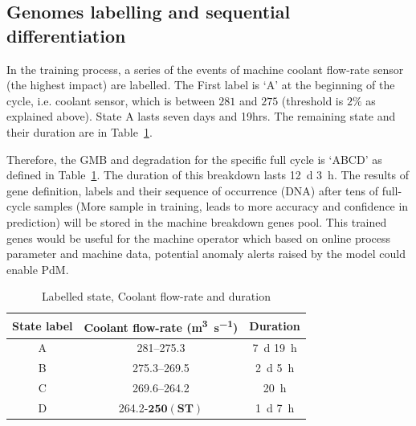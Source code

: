 \documentclass[conference]{IEEEtran}
\begin{document}
\subsection{Genomes labelling and sequential differentiation }
\label{subsec:Genome_labelling}
In the training process, a series of the events of machine coolant flow-rate sensor (the highest impact) are labelled. The First label is ‘A’ at the beginning of the cycle, i.e. coolant sensor, which is between $281$ and $275$ (threshold is $2\%$ as explained above). State A lasts seven days and 19hrs. The remaining state and their duration are in Table~\ref{tab:II}.

Therefore, the GMB and degradation for the specific full cycle is ‘ABCD’ as defined in Table~\ref{tab:II}. The duration of this breakdown lasts \SI{12}{\day} \SI{3}{\hour}. The results of gene definition, labels and their sequence of occurrence (DNA) after tens of full-cycle samples (More sample in training, leads to more accuracy and confidence in prediction) will be stored in the machine breakdown genes pool. This trained genes would be useful for the machine operator which based on online process parameter and machine data, potential anomaly alerts raised by the model could enable PdM.
\begin{table}[tbp]
    \caption{Labelled state, Coolant flow-rate and duration}
    \begin{center}
        \begin{tabular}{|c|c|c|}
            \hline
            \textbf{State label}& \textbf{Coolant flow-rate (\si{\cubic\metre\per\second})}  & \textbf{Duration} \\
            \hline
            A & \numrange[range-phrase = -]{281}{275.3} & \SI{7}{\day} \SI{19}{\hour}  \\
            \hline
            B & \numrange[range-phrase = -]{275.3}{269.5} & \SI{2}{\day} \SI{5}{\hour} \\
            \hline
            C & \numrange[range-phrase = -]{269.6}{264.2} & \SI{20}{\hour} \\
            \hline
            D & \num{264.2}-\underline{$\mathbf{250 (ST)}$} & \SI{1}{\day} \SI{7}{\hour} \\
            \hline
        \end{tabular}
        \label{tab:II}
    \end{center}
\end{table}
\end{document}
